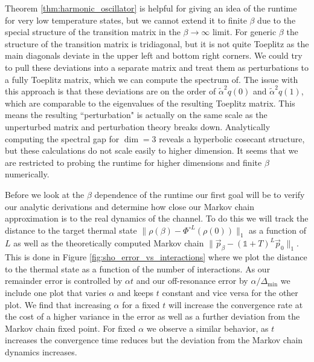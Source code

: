 \documentclass{article}
\newcommand{\norm}[1]{\| #1 \|}
\newcommand{\identity}{\mathds{1}}
\begin{document}
Theorem \ref{thm:harmonic_oscillator} is helpful for giving an idea of the runtime for very low temperature states, but we cannot extend it to finite $\beta$ due to the special structure of the transition matrix in the $\beta \to \infty$ limit. For generic $\beta$ the structure of the transition matrix is tridiagonal, but it is not quite Toeplitz as the main diagonals deviate in the upper left and bottom right corners. We could try to pull these deviations into a separate matrix and treat them as perturbations to a fully Toeplitz matrix, which we can compute the spectrum of. The issue with this approach is that these deviations are on the order of $\widetilde{\alpha}^2 q(0)$ and $\widetilde{\alpha}^2 q(1)$, which are comparable to the eigenvalues of the resulting Toeplitz matrix. This means the resulting ``perturbation" is actually on the same scale as the unperturbed matrix and perturbation theory breaks down. Analytically computing the spectral gap for $\dim = 3$ reveals a hyperbolic cosecant structure, but these calculations do not scale easily to higher dimension. It seems that we are restricted to probing the runtime for higher dimensions and finite $\beta$ numerically.

Before we look at the $\beta$ dependence of the runtime our first goal will be to verify our analytic derivations and determine how close our Markov chain approximation is to the real dynamics of the channel. To do this we will track the distance to the target thermal state $\norm{\rho(\beta) - \Phi^{\circ L}(\rho(0))}_1$ as a function of $L$ as well as the theoretically computed Markov chain $\norm{\vec{p}_{\beta} - (\identity + T)^L \vec{p}_0}_1 $. This is done in Figure \ref{fig:sho_error_vs_interactions} where we plot the distance to the thermal state as a function of the number of interactions. As our remainder error is controlled by $\alpha t$ and our off-resonance error by $\alpha / \Delta_{\min}$ we include one plot that varies $\alpha$ and keeps $t$ constant and vice versa for the other plot. We find that increasing $\alpha$ for a fixed $t$ will increase the convergence rate at the cost of a higher variance in the error as well as a further deviation from the Markov chain fixed point. For fixed $\alpha$ we observe a similar behavior, as $t$ increases the convergence time reduces but the deviation from the Markov chain dynamics increases.
\end{document}
